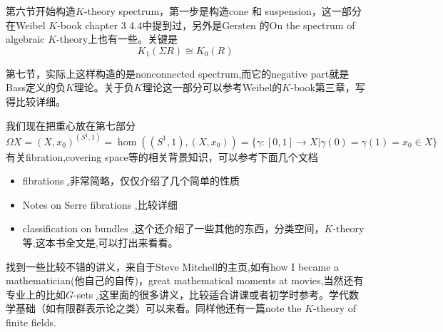 第六节开始构造$K$-theory spectrum，第一步是构造cone 和 suspension，这一部分在Weibel $K$-book chapter 3 4.4中提到过，另外是Gersten 的On the spectrum of algebraic $K$-theory上也有一些。关键是 
\[K_1(\Sigma R)\cong K_0(R)\]

第七节，实际上这样构造的是nonconnected spectrum,而它的negative part就是Bass定义的负$K$理论。关于负$K$理论这一部分可以参考Weibel的$K$-book第三章，写得比较详细。

我们现在把重心放在第七部分
\[\Omega X= (X,x_0)^{(S^1,1)}=\hom((S^1,1),(X,x_0))=\{\gamma\colon [0,1]\longrightarrow X| \gamma(0)=\gamma(1)=x_0\in X\}\]
有关fibration,covering space等的相关背景知识，可以参考下面几个文档
\begin{itemize}
	\item fibrations \href{http://www.math.washington.edu/~palmieri/Courses/2002/Math583/fibrations.pdf},非常简略，仅仅介绍了几个简单的性质
	\item Notes on Serre fibrations \href{http://www.math.washington.edu/~mitchell/Notes/serre.pdf},比较详细
	\item classification on bundles \href{http://www3.nd.edu/~stolz/Math70330(F2008)/cohen.pdf},这个还介绍了一些其他的东西，分类空间，$K$-theory等,这本书全文是\href{The Topology of Fiber Bundles Lecture Notes},可以打出来看看。
\end{itemize}

\label{cha:others}
找到一些比较不错的讲义，来自于Steve Mitchell的主页\href{http://www.math.washington.edu/~mitchell/},如有how I became a  mathematician(他自己的自传)，great mathematical moments at movies,当然还有专业上的比如$G$-sets \href{http://www.math.washington.edu/~mitchell/Algf/gset.pdf},这里面的很多讲义，比较适合讲课或者初学时参考。学代数学基础（如有限群表示论之类）可以来看。同样他还有一篇note the $K$-theory of finite fields.


